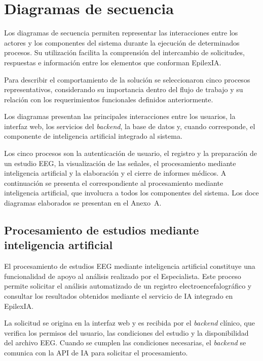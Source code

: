 \section{Diagramas de secuencia}
\label{sec:diagramas-secuencia}

Los diagramas de secuencia permiten representar las interacciones
entre los actores y los componentes del sistema durante la ejecución
de determinados procesos. Su utilización facilita la comprensión
del intercambio de solicitudes, respuestas e información entre
los elementos que conforman EpilexIA.

Para describir el comportamiento de la solución se seleccionaron cinco procesos representativos, considerando su importancia dentro del flujo de trabajo y su relación con los requerimientos funcionales definidos anteriormente.

Los diagramas presentan las principales interacciones entre
los usuarios, la interfaz web, los servicios del \textit{backend},
la base de datos y, cuando corresponde, el componente de
inteligencia artificial integrado al sistema.

\begin{nuevotexto}
Los cinco procesos son la autenticación de usuario, el registro y la preparación de un estudio EEG, la visualización de las señales, el procesamiento mediante inteligencia artificial y la elaboración y el cierre de informes médicos.
A continuación se presenta el correspondiente al procesamiento mediante inteligencia artificial, que involucra a todos los componentes del sistema.
Los doce diagramas elaborados se presentan en el Anexo~A.
\end{nuevotexto}

\subsection{Procesamiento de estudios mediante inteligencia artificial}
\label{subsec:secuencia-procesamiento-ia}

El procesamiento de estudios EEG mediante inteligencia
artificial constituye una funcionalidad de apoyo al
análisis realizado por el Especialista. Este proceso
permite solicitar el análisis automatizado de un
registro electroencefalográfico y consultar los
resultados obtenidos mediante el servicio de IA
integrado en EpilexIA.

La solicitud se origina en la interfaz web y es
recibida por el \textit{backend} clínico, que verifica
los permisos del usuario, las condiciones del
estudio y la disponibilidad del archivo EEG.
Cuando se cumplen las condiciones necesarias,
el \textit{backend} se comunica con la API de IA para
solicitar el procesamiento.

